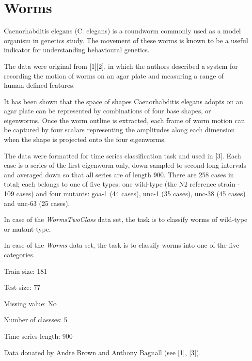 \chapter{Worms}
\hypertarget{md_external_2data_2UCRArchive__2018_2Worms_2README}{}\label{md_external_2data_2UCRArchive__2018_2Worms_2README}
\label{md_external_2data_2UCRArchive__2018_2Worms_2README_autotoc_md232}%
%
 Caenorhabditis elegans (C. elegans) is a roundworm commonly used as a model organism in genetics study. The movement of these worms is known to be a useful indicator for understanding behavioural genetics.

The data were original from \mbox{[}1\mbox{]}\mbox{[}2\mbox{]}, in which the authors described a system for recording the motion of worms on an agar plate and measuring a range of human-\/defined features.

It has been shown that the space of shapes Caenorhabditis elegans adopts on an agar plate can be represented by combinations of four base shapes, or eigenworms. Once the worm outline is extracted, each frame of worm motion can be captured by four scalars representing the amplitudes along each dimension when the shape is projected onto the four eigenworms.

The data were formatted for time series classification task and used in \mbox{[}3\mbox{]}. Each case is a series of the first eigenworm only, down-\/sampled to second-\/long intervals and averaged down so that all series are of length 900. There are 258 cases in total; each belongs to one of five types\+: one wild-\/type (the N2 reference strain -\/ 109 cases) and four mutants\+: goa-\/1 (44 cases), unc-\/1 (35 cases), unc-\/38 (45 cases) and unc-\/63 (25 cases).

In case of the {\itshape Worms\+Two\+Class} data set, the task is to classify worms of wild-\/type or mutant-\/type.

In case of the {\itshape Worms} data set, the task is to classify worms into one of the five categories.

Train size\+: 181

Test size\+: 77

Missing value\+: No

Number of classses\+: 5

Time series length\+: 900

Data donated by Andre Brown and Anthony Bagnall (see \mbox{[}1\mbox{]}, \mbox{[}3\mbox{]}).

